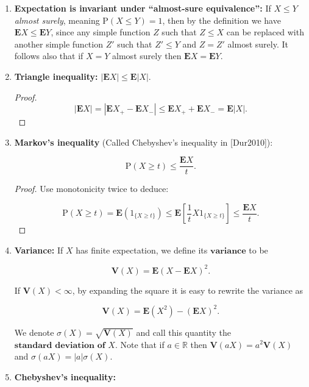 \documentclass[11pt]{report}
\newcommand{\R}{\mathbb{R}}
\theoremstyle{plain}
\theoremstyle{definition}
\begin{document}
\begin{enumerate}[label=\arabic*.]
\item \textbf{Expectation is invariant under ``almost-sure
equivalence'':} If $X\le Y$ \emph{almost surely}, meaning
$\mathrm{P}(X\le Y)=1$, then by the definition we
have $\mathbf{E} X \le \mathbf{E} Y$, since any
simple function $Z$ such that $Z\le X$ can be
replaced with another simple function $Z'$ such that
$Z'\le Y$ and $Z=Z'$ almost surely. It follows also
that if $X=Y$ almost surely then
$\mathbf{E} X=\mathbf{E} Y$.

\item \textbf{Triangle inequality:}
$|\mathbf{E} X| \le \mathbf{E} |X|$.

\begin{proof}

\[
|\mathbf{E} X| = |\mathbf{E} X_+ - \mathbf{E} X_- |  \le \mathbf{E} X_+ + \mathbf{E} X_- = \mathbf{E} |X|.
\]

\end{proof}

\item \textbf{Markov's inequality} (Called Chebyshev's inequality
in [Dur2010]):

\[
\mathrm{P}(X \ge t) \le \frac{\mathbf{E} X}{t}.
\]

\begin{proof}
Use monotonicity twice to deduce:

\[
\mathrm{P}(X \ge t) = \mathbf{E}(1_{\{X\ge t\}}) \le \mathbf{E}\left[ \frac{1}{t} X 1_{\{X\ge t\}} \right] \le \frac{\mathbf{E} X}{t}.
\]

\end{proof}

\item \textbf{Variance:} If $X$ has finite expectation, we define
its $\textbf{variance}$ to be

\[
\mathbf{V}(X) = \mathbf{E}(X-\mathbf{E} X)^2.
\]

If $\mathbf{V}(X)<\infty$, by expanding the square
it is easy to rewrite the variance as

\[
\mathbf{V}(X) = \mathbf{E}(X^2)-(\mathbf{E} X)^2.
\]

We denote $\sigma(X) = \sqrt{\mathbf{V}(X)}$ and
call this quantity the
$\textbf{standard deviation of } X$. Note that if
$a\in \R$ then $\mathbf{V}(a X) = a^2 \mathbf{V}(X)$
and $\sigma(a X)=|a| \sigma(X)$.

\item \textbf{Chebyshev's inequality:}


\end{enumerate}
\end{document}
